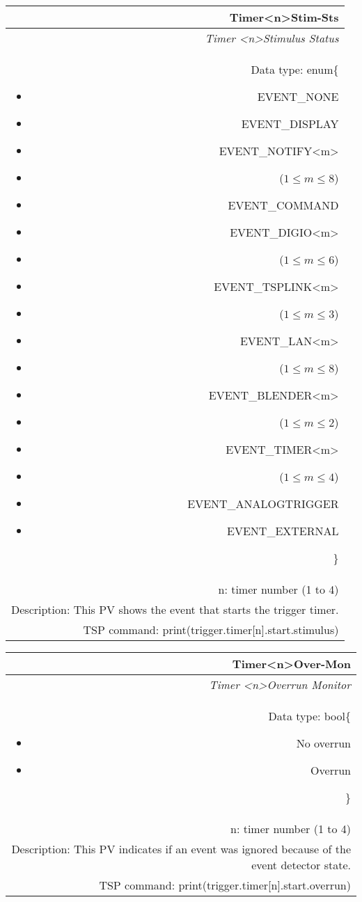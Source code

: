 \documentclass[openany]{article}
\begin{document}
		\begin{tabular}{N}
			\hline
			\bfseries Timer{\textless n\textgreater}Stim-Sts\label{pv:timerstim-sts} \\ \hline
			\emph{Timer \textless n\textgreater Stimulus Status} \\
			Data type: enum\{\begin{itemize}[noitemsep]
				\small
				\item[] EVENT\_NONE
				\item[] EVENT\_DISPLAY
				\item[] EVENT\_NOTIFY\textless m\textgreater
				\item[] ($1\leq m\leq 8$)
				\item[] EVENT\_COMMAND
				\item[] EVENT\_DIGIO\textless m\textgreater
				\item[] ($1\leq m\leq 6$)
				\item[] EVENT\_TSPLINK\textless m\textgreater
				\item[] ($1\leq m\leq 3$)
				\item[] EVENT\_LAN\textless m\textgreater
				\item[] ($1\leq m\leq 8$)
				\item[] EVENT\_BLENDER\textless m\textgreater 
				\item[] ($1\leq m\leq 2$)
				\item[] EVENT\_TIMER\textless m\textgreater
				\item[] ($1\leq m\leq 4$)
				\item[] EVENT\_ANALOGTRIGGER
				\item[] EVENT\_EXTERNAL
			\end{itemize}\} \\
			n: timer number (1 to 4) \\
			Description: This PV shows the event that starts the trigger timer. \\
			TSP command: print(trigger.timer[n].start.stimulus)
		\end{tabular}

		\begin{tabular}{N}
			\hline
			\bfseries Timer{\textless n\textgreater}Over-Mon\label{pv:timerover-mon} \\ \hline
			\emph{Timer \textless n\textgreater Overrun Monitor} \\
			Data type: bool\{\begin{itemize}[noitemsep]
				\small
				\item[] No overrun
				\item[] Overrun
			\end{itemize}\} \\
			n: timer number (1 to 4) \\
			Description: This PV indicates if an event was ignored because of the event detector state. \\
			TSP command: print(trigger.timer[n].start.overrun)
		\end{tabular}
\end{document}

